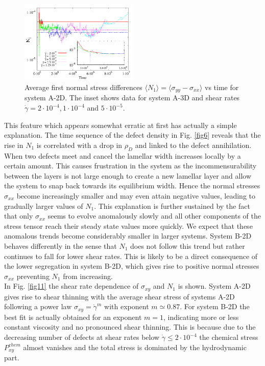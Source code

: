 \documentclass[8.5pt,twoside,twocolumn]{article}
\newcommand{\e}[1]{\cdot10^{#1}}
\begin{document}
\begin{figure}[htp!]
\centering
\includegraphics[angle=0,width=0.5\textwidth]{N1_t_5e-4.pdf}
\caption{Average first normal stress differences $\langle N_1 \rangle= \langle \sigma_{yy}-\sigma_{xx}\rangle$ vs time for system A-2D. The inset shows data for system A-3D and shear rates $\dot{\gamma}=2\cdot10^{-4}, 1\cdot10^{-4}$ and $5\cdot10^{-5}$.}
\label{fig10}
\end{figure}

This feature which appears somewhat erratic at first has actually a simple explanation. 
The time sequence of the defect density in Fig. \ref{fig6} reveals that the rise in $N_1$ is correlated with a drop in $\rho_D$ and linked to the defect annihilation.
When two defects meet and cancel the lamellar width increases locally by a certain amount.
This causes frustration in the system as the incommensurability between the layers is not large enough to create a new lamellar layer and allow the system to snap back towards its equilibrium width.
Hence the normal stresses $\sigma_{xx}$ become increasingly smaller and may even attain negative values, leading to gradually larger values of $N_1$.
This explanation is further sustained by the fact that only $\sigma_{xx}$ seems to evolve anomalously slowly and all other components of the stress tensor reach their steady state values more quickly.
We expect that these anomalous trends become considerably smaller in larger systems.
System B-2D behaves differently in the sense that $N_1$ does not follow this trend but rather continues to fall for lower shear rates. 
This is likely to be a direct consequence of the lower segregation in system B-2D, which gives rise to positive normal stresses $\sigma_{xx}$ preventing $N_1$ from increasing.\\
In Fig. \ref{fig11} the shear rate dependence of $\sigma_{xy}$ and $N_1$ is shown. 
System A-2D gives rise to shear thinning with the average shear stress of systems A-2D following a power law $\sigma_{xy}=\dot{\gamma}^m$ with exponent $m\simeq 0.87$.
For system B-2D the best fit is actually obtained for an exponent $m=1$, indicating more or less constant viscosity and no pronounced shear thinning.
This is because due to the decreasing number of defects at shear rates below $\dot{\gamma}\le2\e{-4}$ the chemical stress $P^{chem}_{xy}$ almost vanishes and the total stress is dominated by the hydrodynamic part.\\
\end{document}
